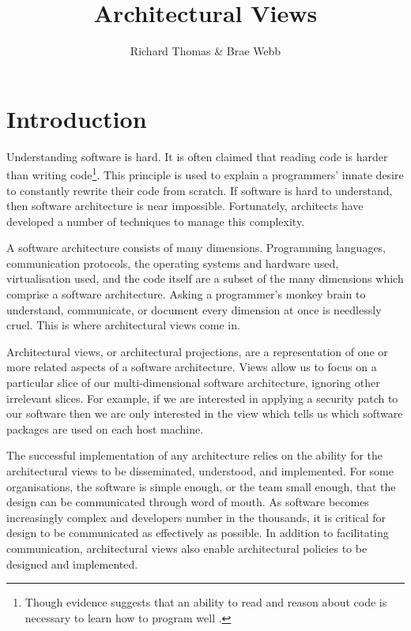 \title{Architectural Views}
\author{Richard Thomas \& Brae Webb}
\date{} %

\maketitle

\section{Introduction}

Understanding software is hard.
It is often claimed that reading code is harder than writing code\footnote{Though evidence suggests that an ability to read and reason 
about code is necessary to learn how to program well \cite{lister-tracing-explaining-writing} \cite{lister-neo-piagetian}.}.
This principle is used to explain a programmers' innate desire to constantly rewrite their code from scratch.
If software is hard to understand, then software architecture is near impossible.
Fortunately, architects have developed a number of techniques to manage this complexity.

A software architecture consists of many dimensions.
Programming languages, communication protocols, the operating systems and hardware used, virtualisation used,
and the code itself are a subset of the many dimensions which comprise a software architecture.
Asking a programmer's monkey brain to understand, communicate, or document every dimension at once is needlessly cruel.
This is where architectural views come in.

Architectural views, or architectural projections, are a representation of one or more related aspects of a software architecture.
Views allow us to focus on a particular slice of our multi-dimensional software architecture, ignoring other irrelevant slices.
For example, if we are interested in applying a security patch to our software then we are only interested in the view
which tells us which software packages are used on each host machine.

The successful implementation of any architecture relies on the ability for the architectural views
to be disseminated, understood, and implemented.
For some organisations, the software is simple enough, or the team small enough, that the design
can be communicated through word of mouth.
As software becomes increasingly complex and developers number in the thousands,
it is critical for design to be communicated as effectively as possible.
In addition to facilitating communication,
architectural views also enable architectural policies to be designed and implemented.

